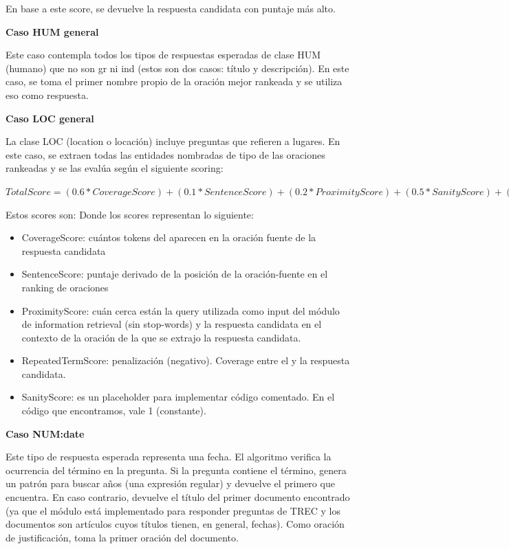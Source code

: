En base a este score, se devuelve la respuesta candidata con puntaje más alto. \newline

\textbf{Caso HUM general} \newline

Este caso contempla todos los tipos de respuestas esperadas de clase HUM (humano) que no son gr ni ind (estos son dos casos: título y descripción). En este caso, se toma el primer nombre propio de la oración mejor rankeada y se utiliza eso como respuesta. \newline

\textbf{Caso LOC general} \newline

La clase LOC (location o locación) incluye preguntas que refieren a lugares.  En este caso, se extraen todas las entidades nombradas de tipo  de las oraciones rankeadas y se las evalúa según el siguiente scoring:

$TotalScore = (0.6 * CoverageScore) + (0.1 * SentenceScore) + (0.2 * ProximityScore)	+ (0.5 * SanityScore) + (0.3 * RepeatedTermScore)$ \newline

Estos scores son:
Donde los scores representan lo siguiente:
\begin{itemize}
  \item CoverageScore: cuántos tokens del  aparecen en la oración fuente de la respuesta candidata
  \item SentenceScore: puntaje derivado de la posición de la oración-fuente en el ranking de oraciones
  \item ProximityScore: cuán cerca están la query utilizada como input del módulo de information retrieval (sin stop-words) y la respuesta candidata en el contexto de la oración de la que se extrajo la respuesta candidata.
  \item RepeatedTermScore: penalización (negativo). Coverage entre el  y la respuesta candidata.
  \item SanityScore: es un placeholder para implementar código comentado. En el código que encontramos, vale 1 (constante).
\end{itemize}


\textbf{Caso NUM:date} \newline

Este tipo de respuesta esperada representa una fecha. El algoritmo verifica la ocurrencia del término  en la pregunta. Si la pregunta contiene el término, genera un patrón para buscar años (una expresión regular) y devuelve el primero que encuentra. En caso contrario, devuelve el título del primer documento encontrado (ya que el módulo está implementado para responder preguntas de TREC y los documentos son artículos cuyos títulos tienen, en general, fechas). Como oración de justificación, toma la primer oración del documento.

